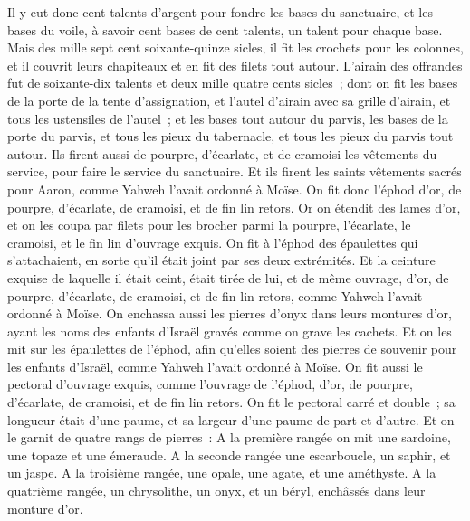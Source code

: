 \begin{multicols}{2}
Il y eut donc cent talents d'argent pour fondre les bases du sanctuaire, et les bases du voile, à savoir cent bases de cent talents, un talent pour chaque base.
Mais des mille sept cent soixante-quinze sicles, il fit les crochets pour les colonnes, et il couvrit leurs chapiteaux et en fit des filets tout autour.
L'airain des offrandes fut de soixante-dix talents et deux mille quatre cents sicles~;
dont on fit les bases de la porte de la tente d'assignation, et l'autel d'airain avec sa grille d'airain, et tous les ustensiles de l'autel~;
et les bases tout autour du parvis, les bases de la porte du parvis, et tous les pieux du tabernacle, et tous les pieux du parvis tout autour.
\VerseOne{}Ils firent aussi de pourpre, d'écarlate, et de cramoisi les vêtements du service, pour faire le service du sanctuaire. Et ils firent les saints vêtements sacrés pour Aaron, comme Yahweh l'avait ordonné à Moïse.
On fit donc l'éphod d'or, de pourpre, d'écarlate, de cramoisi, et de fin lin retors.
Or on étendit des lames d'or, et on les coupa par filets pour les brocher parmi la pourpre, l'écarlate, le cramoisi, et le fin lin d'ouvrage exquis.
On fit à l'éphod des épaulettes qui s'attachaient, en sorte qu'il était joint par ses deux extrémités.
Et la ceinture exquise de laquelle il était ceint, était tirée de lui, et de même ouvrage, d'or, de pourpre, d'écarlate, de cramoisi, et de fin lin retors, comme Yahweh l'avait ordonné à Moïse.
On enchassa aussi les pierres d'onyx dans leurs montures d'or, ayant les noms des enfants d'Israël gravés comme on grave les cachets.
Et on les mit sur les épaulettes de l'éphod, afin qu'elles soient des pierres de souvenir pour les enfants d'Israël, comme Yahweh l'avait ordonné à Moïse.
On fit aussi le pectoral d'ouvrage exquis, comme l'ouvrage de l'éphod, d'or, de pourpre, d'écarlate, de cramoisi, et de fin lin retors.
On fit le pectoral carré et double~; sa longueur était d'une paume, et sa largeur d'une paume de part et d'autre.
Et on le garnit de quatre rangs de pierres~: A la première rangée on mit une sardoine, une topaze et une émeraude.
A la seconde rangée une escarboucle, un saphir, et un jaspe.
A la troisième rangée, une opale, une agate, et une améthyste.
A la quatrième rangée, un chrysolithe, un onyx, et un béryl, enchâssés dans leur monture d'or.

\end{multicols}
